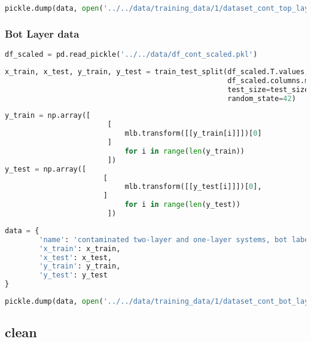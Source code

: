\begin{lstlisting}[language=Python]
pickle.dump(data, open('../../data/training_data/1/dataset_cont_top_layer.pkl', 'wb'))
\end{lstlisting}

\hypertarget{bot-layer-data-1}{%
\subsubsection{Bot Layer data}\label{bot-layer-data-1}}

\begin{lstlisting}[language=Python]
df_scaled = pd.read_pickle('../../data/df_cont_scaled.pkl')
\end{lstlisting}

\begin{lstlisting}[language=Python]
x_train, x_test, y_train, y_test = train_test_split(df_scaled.T.values,
                                                    df_scaled.columns.map(lambda x: x.split('_')[1]), # second part of the filename is the bot label
                                                    test_size=test_size_ratio,
                                                    random_state=42)
\end{lstlisting}

\begin{lstlisting}[language=Python]
y_train = np.array([    
                        [
                            mlb.transform([[y_train[i]]])[0]
                        ] 
                            for i in range(len(y_train))
                        ])
y_test = np.array([ 
                       [
                            mlb.transform([[y_test[i]]])[0],
                       ] 
                            for i in range(len(y_test))
                        ])
\end{lstlisting}

\begin{lstlisting}[language=Python]
data = {
        'name': 'contaminated two-layer and one-layer systems, bot labels',
        'x_train': x_train,
        'x_test': x_test,
        'y_train': y_train,
        'y_test': y_test
}
\end{lstlisting}

\begin{lstlisting}[language=Python]
pickle.dump(data, open('../../data/training_data/1/dataset_cont_bot_layer.pkl', 'wb'))
\end{lstlisting}

\hypertarget{clean}{%
\subsection{clean}\label{clean}}


